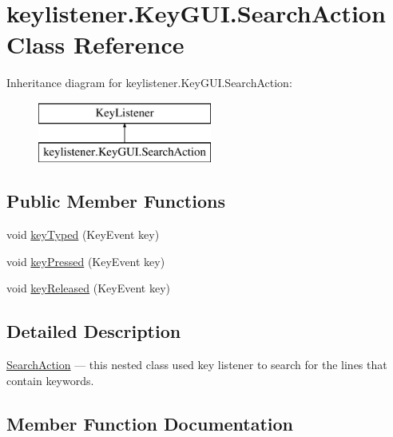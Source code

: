 \hypertarget{classkeylistener_1_1_key_g_u_i_1_1_search_action}{}\section{keylistener.\+Key\+G\+U\+I.\+Search\+Action Class Reference}
\label{classkeylistener_1_1_key_g_u_i_1_1_search_action}
Inheritance diagram for keylistener.\+Key\+G\+U\+I.\+Search\+Action\+:\begin{figure}[H]
\begin{center}
\leavevmode
\includegraphics[height=2.000000cm]{classkeylistener_1_1_key_g_u_i_1_1_search_action}
\end{center}
\end{figure}
\subsection*{Public Member Functions}
\begin{DoxyCompactItemize}
\item 
void \hyperlink{classkeylistener_1_1_key_g_u_i_1_1_search_action_a0539df25ca413569d89231b475ed46bd}{key\+Typed} (Key\+Event key)
\item 
void \hyperlink{classkeylistener_1_1_key_g_u_i_1_1_search_action_a951f68989841530858dd67572800073b}{key\+Pressed} (Key\+Event key)
\item 
void \hyperlink{classkeylistener_1_1_key_g_u_i_1_1_search_action_a366fb562665be4c9e0c56402e56d5d67}{key\+Released} (Key\+Event key)
\end{DoxyCompactItemize}


\subsection{Detailed Description}
\hyperlink{classkeylistener_1_1_key_g_u_i_1_1_search_action}{Search\+Action} --- this nested class used key listener to search for the lines that contain keywords. 

\subsection{Member Function Documentation}
\mbox{\label{classkeylistener_1_1_key_g_u_i_1_1_search_action_a951f68989841530858dd67572800073b}} 
